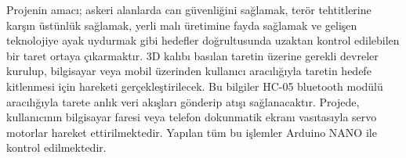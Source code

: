 
\label{CH:BolumOzet}

Projenin amacı; askeri alanlarda can güvenliğini sağlamak, terör tehtitlerine karşın üstünlük sağlamak, yerli malı üretimine fayda sağlamak ve gelişen teknolojiye ayak uydurmak gibi hedefler doğrultusunda uzaktan kontrol edilebilen bir taret ortaya çıkarmaktır. 3D kalıbı basılan taretin üzerine gerekli devreler kurulup, bilgisayar veya mobil üzerinden kullanıcı aracılığıyla taretin hedefe kitlenmesi için hareketi gerçekleştirilecek. Bu bilgiler HC-05 bluetooth modülü aracılığıyla tarete anlık veri akışları gönderip atışı sağlanacaktır. Projede, kullanıcının bilgisayar faresi veya telefon dokunmatik ekranı vasıtasıyla servo motorlar hareket ettirilmektedir. Yapılan tüm bu işlemler Arduino NANO ile kontrol edilmektedir.
               
\clearpage